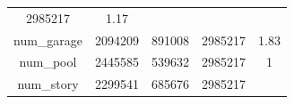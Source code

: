 \documentclass[]{book}
\theoremstyle{definition}
\theoremstyle{definition}
\theoremstyle{definition}
\theoremstyle{remark}
\begin{document}
\begin{longtable}[]{@{}ccccc@{}}
\begin{minipage}[t]{0.12\columnwidth}
2985217\strut
\end{minipage} & \begin{minipage}[t]{0.12\columnwidth}\centering\strut
1.17\strut
\end{minipage}\tabularnewline
\begin{minipage}[t]{0.35\columnwidth}\centering\strut
num\_garage\strut
\end{minipage} & \begin{minipage}[t]{0.12\columnwidth}\centering\strut
2094209\strut
\end{minipage} & \begin{minipage}[t]{0.13\columnwidth}\centering\strut
891008\strut
\end{minipage} & \begin{minipage}[t]{0.12\columnwidth}\centering\strut
2985217\strut
\end{minipage} & \begin{minipage}[t]{0.12\columnwidth}\centering\strut
1.83\strut
\end{minipage}\tabularnewline
\begin{minipage}[t]{0.35\columnwidth}\centering\strut
num\_pool\strut
\end{minipage} & \begin{minipage}[t]{0.12\columnwidth}\centering\strut
2445585\strut
\end{minipage} & \begin{minipage}[t]{0.13\columnwidth}\centering\strut
539632\strut
\end{minipage} & \begin{minipage}[t]{0.12\columnwidth}\centering\strut
2985217\strut
\end{minipage} & \begin{minipage}[t]{0.12\columnwidth}\centering\strut
1\strut
\end{minipage}\tabularnewline
\begin{minipage}[t]{0.35\columnwidth}\centering\strut
num\_story\strut
\end{minipage} & \begin{minipage}[t]{0.12\columnwidth}\centering\strut
2299541\strut
\end{minipage} & \begin{minipage}[t]{0.13\columnwidth}\centering\strut
685676\strut
\end{minipage} & \begin{minipage}[t]{0.12\columnwidth}\centering\strut
2985217\strut
\end{minipage} & \begin{minipage}[t]{0.12\columnwidth}\centering\strut

\end{minipage}
\end{longtable}
\end{document}
